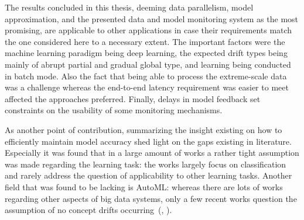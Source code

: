 The results concluded in this thesis, deeming data parallelism, model approximation, and the presented data and model monitoring system as the most promising, are applicable to other applications in case their requirements match the one considered here to a necessary extent. The important factors were the machine learning paradigm being deep learning, the expected drift types being mainly of abrupt partial and gradual global type, and learning being conducted in batch mode. Also the fact that being able to process the extreme-scale data was a challenge whereas the end-to-end latency requirement was easier to meet affected the approaches preferred. Finally, delays in model feedback set constraints on the usability of some monitoring mechanisms.



 
 
 As another point of contribution, summarizing the insight existing on how to efficiently maintain model accuracy shed light on the gaps existing in literature. Especially it was found that in a large amount of works a rather tight assumption was made regarding the learning task: the works largely focus on classification and rarely address the question of applicability to other learning tasks. Another field that was found to be lacking is AutoML: whereas there are lots of works regarding other aspects of big data systems, only a few recent works question the assumption of no concept drifts occurring~(\cite{celikAdaptationStrategiesAutomated2021}, \cite{madridAutoMLPresenceDrift2019}).
 
 
